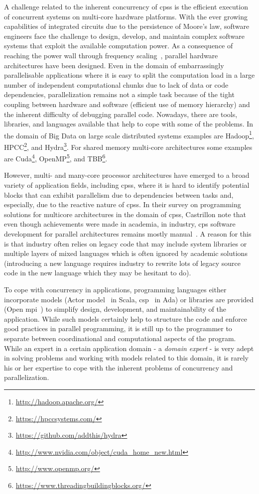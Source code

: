 A challenge related to the inherent concurrency of \glspl{cps} is the efficient execution of concurrent systems on multi-core hardware platforms.
With the ever growing capabilities of integrated circuits due to the persistence of Moore's law, software engineers face the challenge to design, develop, and maintain complex software systems that exploit the available computation power.
As a consequence of reaching the power wall through frequency scaling~\cite{pollack1999}, parallel hardware architectures have been designed.
Even in the domain of embarrassingly parallelisable applications where it is easy to split the computation load in a large number of independent computational chunks due to lack of data or code dependencies, parallelization remains not a simple task because of the tight coupling between hardware and software (\eg efficient use of memory hierarchy) and the inherent difficulty of debugging parallel code.
Nowadays, there are tools, libraries, and languages available that help to cope with some of the problems.
In the domain of Big Data on large scale distributed systems examples are Hadoop\footnote{\url{http://hadoop.apache.org/}}, HPCC\footnote{\url{https://hpccsystems.com/}}, and Hydra\footnote{\url{https://github.com/addthis/hydra}}.
For shared memory multi-core architectures some examples are Cuda\footnote{\url{http://www.nvidia.com/object/cuda_home_new.html}}, OpenMP\footnote{\url{http://www.openmp.org/}}, and TBB\footnote{\url{https://www.threadingbuildingblocks.org/}}.

However, multi- and many-core processor architectures have emerged to a broad variety of application fields, including \glspl{cps}, where it is hard to identify potential blocks that can exhibit parallelism due to dependencies between tasks and, especially, due to the reactive nature of \glspl{cps}.
In their survey on programming solutions for multicore architectures in the domain of \glspl{cps}, Castrillon \etal note that even though achievements were made in academia, in industry, \gls{cps} software development for parallel architectures remains mostly manual~\cite{castrillon2015}.
A reason for this is that industry often relies on legacy code that may include system libraries or multiple layers of mixed languages which is often ignored by academic solutions (\eg introducing a new language requires industry to rewrite lots of legacy source code in the new language which they may be hesitant to do).

To cope with concurrency in applications, programming languages either incorporate models (\eg Actor model~\cite{agha1985} in Scala, \gls{csp}~\cite{hoare1978} in Ada) or libraries are provided (Open \gls{mpi}~\cite{open-mpi}) to simplify design, development, and maintainability of the application.
While such models certainly help to structure the code and enforce good practices in parallel programming, it is still up to the programmer to separate between coordinational and computational aspects of the program.
While an expert in a certain application domain - a \emph{domain expert} - is very adept in solving problems and working with models related to this domain, it is rarely his or her expertise to cope with the inherent problems of concurrency and parallelization.

